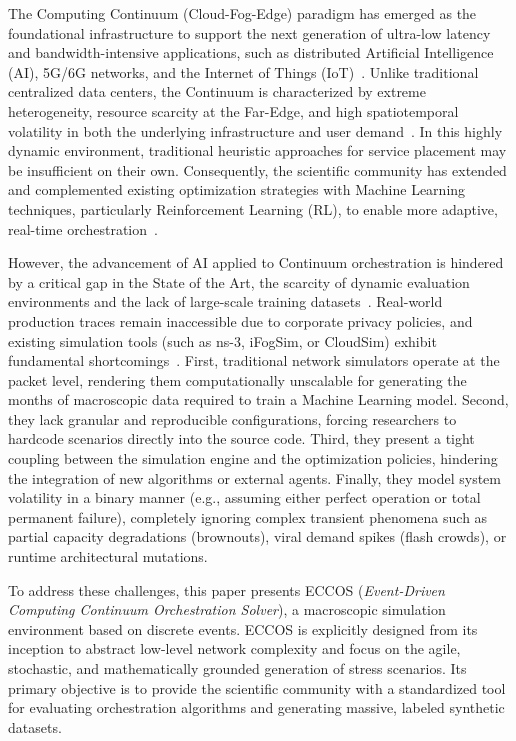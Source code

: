 \documentclass[ASNA]{USG} %
\begin{document}
The Computing Continuum (Cloud-Fog-Edge) paradigm has emerged as the foundational infrastructure to support the next generation of ultra-low latency and bandwidth-intensive applications, such as distributed Artificial Intelligence (AI), 5G/6G networks, and the Internet of Things (IoT)~\cite{Al-Dulaimy2024The}. Unlike traditional centralized data centers, the Continuum is characterized by extreme heterogeneity, resource scarcity at the Far-Edge, and high spatiotemporal volatility in both the underlying infrastructure and user demand~\cite{Sajjad2026Service}. In this highly dynamic environment, traditional heuristic approaches for service placement may be insufficient on their own. Consequently, the scientific community has extended and complemented existing optimization strategies with Machine Learning techniques, particularly Reinforcement Learning (RL), to enable more adaptive, real-time orchestration~\cite{Walia2024AI-Empowered}.

However, the advancement of AI applied to Continuum orchestration is hindered by a critical gap in the State of the Art, the scarcity of dynamic evaluation environments and the lack of large-scale training datasets~\cite{Mihaiu2025Resource}. Real-world production traces remain inaccessible due to corporate privacy policies, and existing simulation tools (such as ns-3, iFogSim, or CloudSim) exhibit fundamental shortcomings~\cite{fi17090382,Qi2025A}. First, traditional network simulators operate at the packet level, rendering them computationally unscalable for generating the months of macroscopic data required to train a Machine Learning model. Second, they lack granular and reproducible configurations, forcing researchers to hardcode scenarios directly into the source code. Third, they present a tight coupling between the simulation engine and the optimization policies, hindering the integration of new algorithms or external agents. Finally, they model system volatility in a binary manner (e.g., assuming either perfect operation or total permanent failure), completely ignoring complex transient phenomena such as partial capacity degradations (brownouts), viral demand spikes (flash crowds), or runtime architectural mutations.

To address these challenges, this paper presents \textsc{ECCOS} (\textit{Event-Driven Computing Continuum Orchestration Solver}), a macroscopic simulation environment based on discrete events. ECCOS is explicitly designed from its inception to abstract low-level network complexity and focus on the agile, stochastic, and mathematically grounded generation of stress scenarios. Its primary objective is to provide the scientific community with a standardized tool for evaluating orchestration algorithms and generating massive, labeled synthetic datasets.
\end{document}
